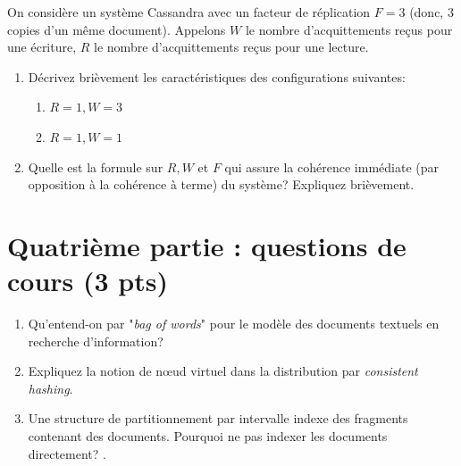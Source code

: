 \documentclass[11pt,a4paper]{article}
\begin{document}
On considère un système Cassandra avec un facteur de réplication $F= 3$ (donc, 3 copies
d'un même document). Appelons $W$ le nombre d'acquittements reçus pour une écriture, $R$ le
nombre d'acquittements reçus pour une lecture.
\begin{enumerate}
 \item 
 Décrivez brièvement les caractéristiques
des configurations suivantes:
\begin{enumerate}
  \item $R=1, W=3$
  \item $R=1,W=1$
\end{enumerate}
\item
Quelle est la formule sur $R, W$ et $F$ qui assure la cohérence immédiate (par opposition
à la cohérence à terme) du système? Expliquez brièvement.
\end{enumerate}

\section*{Quatrième partie : questions de cours (3 pts)}

\begin{enumerate}
  \item Qu'entend-on par "\textit{bag of words}" pour le modèle des documents textuels en
     recherche d'information? 
     
  \item Expliquez la notion de n{\oe}ud virtuel dans la distribution par \textit{consistent hashing}.
  
  \item Une structure de partitionnement par intervalle indexe des fragments contenant des documents.
     Pourquoi ne pas indexer les documents directement? .

\end{enumerate}
\end{document}
